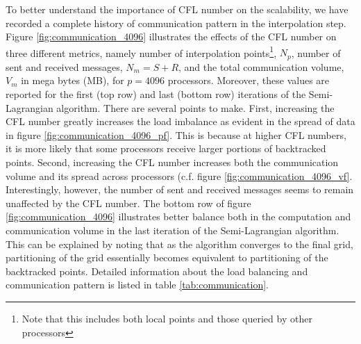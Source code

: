 To better understand the importance of CFL number on the scalability, we have recorded a complete history of communication pattern in the interpolation step. Figure \ref{fig:communication_4096} illustrates the effects of the CFL number on three different metrics, namely number of interpolation points\footnote{Note that this includes both local points and those queried by other processors}, $N_p$, number of sent and received messages, $N_m = S + R$, and the total communication volume, $V_m$ in mega bytes (MB), for $p=4096$ processors. Moreover, these values are reported for the first (top row) and last (bottom row) iterations of the Semi-Lagrangian algorithm. There are several points to make. First, increasing the CFL number greatly increases the load imbalance as evident in the spread of data in figure \ref{fig:communication_4096_pf}. This is because at higher CFL numbers, it is more likely that some processors receive larger portions of backtracked points. Second, increasing the CFL number increases both the communication volume and its spread across processors (c.f. figure \ref{fig:communication_4096_vf}. Interestingly, however, the number of sent and received messages seems to remain unaffected by the CFL number. The bottom row of figure \ref{fig:communication_4096} illustrates better balance both in the computation and communication volume in the last iteration of the Semi-Lagrangian algorithm. This can be explained by noting that as the algorithm converges to the final grid, partitioning of the grid essentially becomes equivalent to partitioning of the backtracked points. Detailed information about the load balancing and communication pattern is listed in table \ref{tab:communication}.
